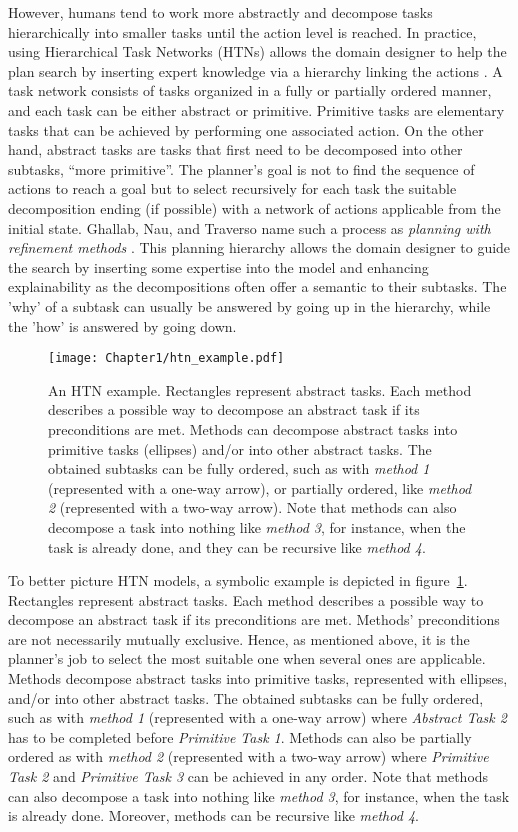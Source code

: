 However, humans tend to work more abstractly and decompose tasks hierarchically into smaller tasks until the action level is reached. In practice, using Hierarchical Task Networks (HTNs) allows the domain designer to help the plan search by inserting expert knowledge via a hierarchy linking the actions \cite{erol_complexity_1996}. A task network consists of tasks organized in a fully or partially ordered manner, and each task can be either abstract or primitive. Primitive tasks are elementary tasks that can be achieved by performing one associated action.
On the other hand, abstract tasks are tasks that first need to be decomposed into other subtasks, ``more primitive''. The planner's goal is not to find the sequence of actions to reach a goal but to select recursively for each task the suitable decomposition ending (if possible) with a network of actions applicable from the initial state. Ghallab, Nau, and Traverso name such a process as \textit{planning with refinement methods} \cite{ghallab2016automated}. This planning hierarchy allows the domain designer to guide the search by inserting some expertise into the model and enhancing explainability as the decompositions often offer a semantic to their subtasks. The 'why' of a subtask can usually be answered by going up in the hierarchy, while the 'how' is answered by going down. 

\begin{figure}
    \center
    \texttt{[image: Chapter1/htn\_example.pdf]}
    \caption{An HTN example. Rectangles represent abstract tasks. Each method describes a possible way to decompose an abstract task if its preconditions are met. Methods can decompose abstract tasks into primitive tasks (ellipses) and/or into other abstract tasks. The obtained subtasks can be fully ordered, such as with \emph{method 1} (represented with a one-way arrow), or partially ordered, like \emph{method 2} (represented with a two-way arrow). Note that methods can also decompose a task into nothing like \emph{method 3}, for instance, when the task is already done, and they can be recursive like \emph{method 4}.
    }
    \label{fig:htn_example}
\end{figure}

To better picture HTN models, a symbolic example is depicted in figure~\ref{fig:htn_example}.
Rectangles represent abstract tasks. Each method describes a possible way to decompose an abstract task if its preconditions are met. Methods' preconditions are not necessarily mutually exclusive. Hence, as mentioned above, it is the planner's job to select the most suitable one when several ones are applicable.
Methods decompose abstract tasks into primitive tasks, represented with ellipses, and/or into other abstract tasks. The obtained subtasks can be fully ordered, such as with \emph{method 1} (represented with a one-way arrow) where \emph{Abstract Task 2} has to be completed before \emph{Primitive Task 1}. Methods can also be partially ordered as with \emph{method 2} (represented with a two-way arrow) where \emph{Primitive Task 2} and \emph{Primitive Task 3} can be achieved in any order. Note that methods can also decompose a task into nothing like \emph{method 3}, for instance, when the task is already done. Moreover, methods can be recursive like \emph{method 4}.

